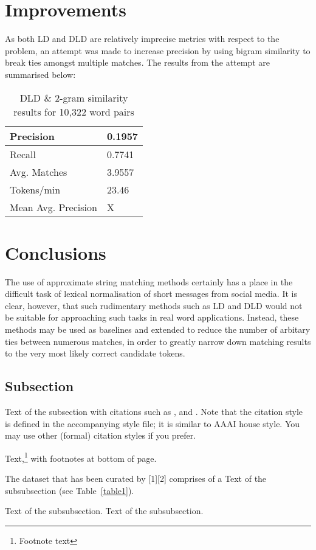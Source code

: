 \documentclass[11pt]{article}
\begin{document}
\section{Improvements}
As both LD and DLD are relatively imprecise metrics with respect to the problem, an attempt was made to increase precision by using bigram similarity to break ties amongst multiple matches. The results from the attempt are summarised below:


\begin{table}[h]
\begin{center}
\begin{tabular}{|l|l|}
      \hline
      Precision & 0.1957\\
      \hline
      Recall & 0.7741\\
      \hline
      Avg. Matches & 3.9557\\
      \hline
      Tokens/min & 23.46\\
      \hline
      Mean Avg. Precision & X\\
      \hline
\end{tabular}
\caption{DLD \& 2-gram similarity results for 10,322 word pairs}\label{table2}
\end{center}
\end{table}



\section{Conclusions}
The use of approximate string matching methods certainly has a place in the difficult task of lexical normalisation of short messages from social media. It is clear, however, that such rudimentary methods such as LD and DLD would not be suitable for approaching such tasks in real word applications. Instead, these methods may be used as baselines and extended to reduce the number of arbitary ties between numerous matches, in order to greatly narrow down matching results to the very most likely correct candidate tokens. 



\subsection{Subsection}

Text of the subsection with citations such as 
,  and .
Note that the citation style is defined in the accompanying
style file; it is similar to AAAI house style. You may use
other (formal) citation styles if you prefer.


Text,\footnote{Footnote text} with footnotes at bottom of page.


The dataset that has been curated by [1][2] comprises of a 
Text of the subsubsection (see Table~\ref{table1}).




Text of the subsubsection.
Text of the subsubsection.



\end{document}
